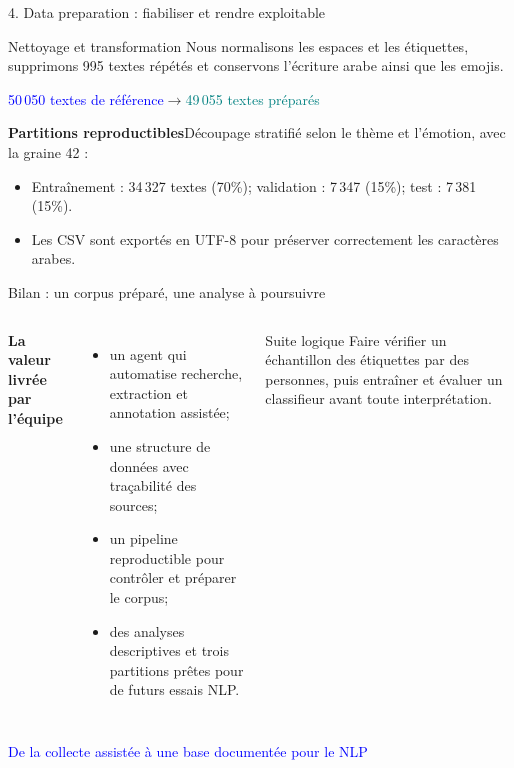 \documentclass[aspectratio=169,10pt]{beamer}
\begin{document}
\begin{frame}{4. Data preparation : fiabiliser et rendre exploitable}
\begin{block}{Nettoyage et transformation}
Nous normalisons les espaces et les étiquettes, supprimons 995 textes répétés et conservons l'écriture arabe ainsi que les emojis.
\end{block}
\begin{center}
\Large\textcolor{Blue}{50\,050 textes de référence}\quad$\longrightarrow$\quad\textcolor{Teal}{49\,055 textes préparés}
\end{center}
\vspace{.3cm}
\textbf{Partitions reproductibles}\quad Découpage stratifié selon le thème et l'émotion, avec la graine 42 :
\begin{itemize}
\item Entraînement : 34\,327 textes (70\%); validation : 7\,347 (15\%); test : 7\,381 (15\%).
\item Les CSV sont exportés en UTF-8 pour préserver correctement les caractères arabes.
\end{itemize}
\end{frame}

\begin{frame}{Bilan : un corpus préparé, une analyse à poursuivre}
\begin{columns}[T,onlytextwidth]
\textbf{La valeur livrée par l'équipe}
\begin{itemize}\item un agent qui automatise recherche, extraction et annotation assistée;\item une structure de données avec traçabilité des sources;\item un pipeline reproductible pour contrôler et préparer le corpus;\item des analyses descriptives et trois partitions prêtes pour de futurs essais NLP.\end{itemize}
\begin{block}{Suite logique}
Faire vérifier un échantillon des étiquettes par des personnes, puis entraîner et évaluer un classifieur avant toute interprétation.
\end{block}
\end{columns}
\vfill
\begin{center}\Large\textcolor{Blue}{De la collecte assistée à une base documentée pour le NLP}\end{center}
\end{frame}
\end{document}
